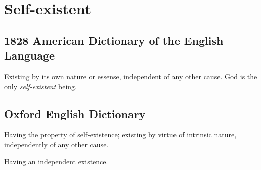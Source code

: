 \section{Self-existent}
	\label{SELFEXISTENT}
	

\subsection{1828 American Dictionary of the English Language} %
	\label{SELFEXISTENT-1828}

	\begin{compactitem}
		\item Existing by its own nature or essense, independent of any other cause. God is the only \textit{self-existent} being.
	\end{compactitem}

\subsection{Oxford English Dictionary} %
	\label{SELFEXISTENT-OED}

	\begin{compactitem}
		\item[1] Having the property of self-existence; existing by virtue of intrinsic nature, independently of any other cause.
		\item[2] Having an independent existence.
	\end{compactitem}


	
